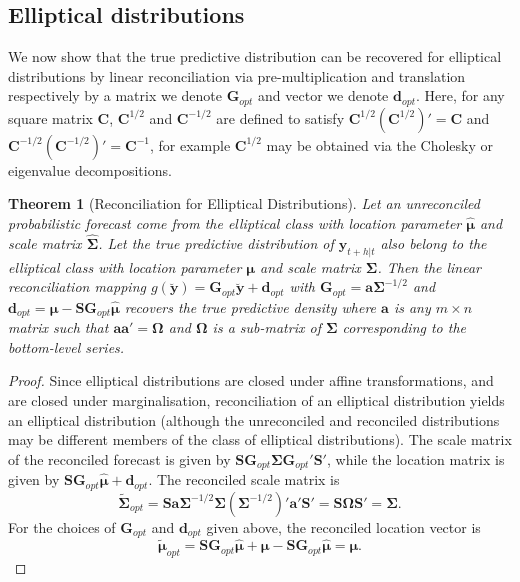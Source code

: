 \documentclass[12pt]{article}
\newtheorem{theo}{Theorem}[section]
\theoremstyle{definition}
\begin{document}
\subsection{Elliptical distributions}

We now show that the true predictive distribution can be recovered for elliptical distributions by linear reconciliation via pre-multiplication and translation respectively by a matrix we denote ${\bm G}_{opt}$ and vector we denote  ${\bm d}_{opt}$. Here, for any square matrix $\bm{C}$, $\bm{C}^{1/2}$ and $\bm{C}^{-1/2}$ are defined to satisfy $\bm{C}^{1/2}(\bm{C}^{1/2})'=\bm{C}$ and $\bm{C}^{-1/2}(\bm{C}^{-1/2})'=\bm{C}^{-1}$, for example $\bm{C}^{1/2}$ may be obtained via the Cholesky or eigenvalue decompositions.

\begin{theo}[Reconciliation for Elliptical Distributions]
	Let an unreconciled probabilistic forecast come from the elliptical class with location parameter $\hat{\bm{\mu}}$ and scale matrix $\hat{\bm{\Sigma}}$. Let the true predictive distribution of $\bm{y}_{t+h|t}$ also belong to the elliptical class with location parameter $\bm{\mu}$ and scale matrix $\bm{\Sigma}$. Then the linear reconciliation mapping $g(\breve{\bm{y}})=\bm{G}_{opt}\breve{\bm{y}}+\bm{d}_{opt}$ with $\bm{G}_{opt}={\bm{a}}{\bm\Sigma}^{-1/2}$ and $\bm{d}_{opt}=\bm{\mu}-\bm{S}\bm{G}_{opt}\hat{\bm{\mu}}$ recovers the true predictive density where ${\bm{a}}$ is any $m\times n$ matrix such that ${\bm{a}}{\bm{a}}'=\bm{\Omega}$ and $\bm{\Omega}$ is a sub-matrix of $\bm{\Sigma}$ corresponding to the bottom-level series.
\end{theo}

\begin{proof}
   Since elliptical distributions are closed under affine transformations, and are closed under marginalisation, reconciliation of an elliptical distribution yields an elliptical distribution (although the unreconciled and reconciled distributions may be different members of the class of elliptical distributions). The scale matrix of the reconciled forecast is given by $\bm{S}\bm{G}_{opt}\bm{\Sigma}\bm{G}_{opt}'\bm{S}'$, while the location matrix is given by $\bm{S}\bm{G}_{opt}\hat{\bm{\mu}}+\bm{d}_{opt}$. The reconciled scale matrix is
   \[
     \tilde{\bm{\Sigma}}_{opt}
       = \bm{S}{\bm{a}}{\bm\Sigma}^{-1/2}\bm{\Sigma}\left({\bm\Sigma}^{-1/2}\right)'{\bm{a}}'\bm{S}'
       = \bm{S}\bm{\Omega}\bm{S}'
       = \bm{\Sigma}.
   \]
   For the choices of $\bm{G}_{opt}$ and $\bm{d}_{opt}$ given above, the reconciled location vector is
   \[
     \tilde{\bm{\mu}}_{opt}= \bm{S}\bm{G}_{opt}\hat{\bm{\mu}}+\bm{\mu}-\bm{S}\bm{G}_{opt}\hat{\bm{\mu}}
   = \bm{\mu}.
   \]
\end{proof}
\end{document}
